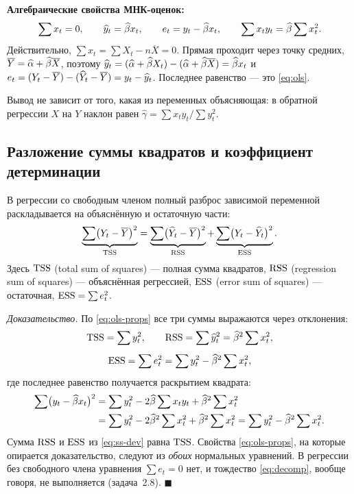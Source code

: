 \textbf{Алгебраические свойства МНК-оценок:}
\begin{equation}
  \sum x_t = 0,
  \qquad
  \widehat{y}_t = \widehat{\beta} x_t,
  \qquad
  e_t = y_t - \widehat{\beta} x_t,
  \qquad
  \sum x_ty_t = \widehat{\beta}\sum x_t^2 .
  \label{eq:ols-props}
\end{equation}
Действительно, $\sum x_t = \sum X_t - n\overline{X} = 0$. Прямая проходит через
точку средних, $\overline{Y} = \widehat{\alpha} + \widehat{\beta}\overline{X}$, поэтому
$\widehat{y}_t = (\widehat{\alpha} + \widehat{\beta} X_t) - (\widehat{\alpha} + \widehat{\beta}\overline{X}) = \widehat{\beta} x_t$ и
$e_t = (Y_t - \overline{Y}) - (\widehat{Y}_t - \overline{Y}) = y_t - \widehat{y}_t$.
Последнее равенство — это \eqref{eq:ols}.

\begin{remark}
Вывод не зависит от того, какая из переменных объясняющая: в обратной регрессии
$X$ на $Y$ наклон равен $\widehat{\gamma} = \sum x_ty_t \big/ \sum y_t^2$.
\end{remark}

\subsection{Разложение суммы квадратов и коэффициент детерминации}\label{sec:decomp}

В регрессии со свободным членом полный разброс зависимой переменной
раскладывается на объяснённую и остаточную части:
\begin{equation}
  \underbrace{\sum\bigl(Y_t - \overline{Y}\bigr)^2}_{\mathrm{TSS}}
  =
  \underbrace{\sum\bigl(\widehat{Y}_t - \overline{Y}\bigr)^2}_{\mathrm{RSS}}
  +
  \underbrace{\sum\bigl(Y_t - \widehat{Y}_t\bigr)^2}_{\mathrm{ESS}}.
  \label{eq:decomp}
\end{equation}
Здесь $\mathrm{TSS}$ (total sum of squares) — полная сумма квадратов, $\mathrm{RSS}$
(regression sum of squares) — объяснённая регрессией, $\mathrm{ESS}$ (error sum of
squares) — остаточная, $\mathrm{ESS} = \sum e_t^2$.

\emph{Доказательство.} По \eqref{eq:ols-props} все три суммы выражаются через
отклонения:
\begin{equation}
\begin{gathered}
  \mathrm{TSS} = \sum y_t^2,
  \qquad
  \mathrm{RSS} = \sum\widehat{y}_t^2 = \widehat{\beta}^2\sum x_t^2,
  \\[4pt]
  \mathrm{ESS} = \sum e_t^2 = \sum y_t^2 - \widehat{\beta}^2\sum x_t^2 ,
\end{gathered}
\label{eq:ss-dev}
\end{equation}
где последнее равенство получается раскрытием квадрата:
\[
\begin{aligned}
  \sum\bigl(y_t - \widehat{\beta} x_t\bigr)^2
  &= \sum y_t^2 - 2\widehat{\beta}\sum x_ty_t + \widehat{\beta}^2\sum x_t^2 \\
  &= \sum y_t^2 - 2\widehat{\beta}^2\sum x_t^2 + \widehat{\beta}^2\sum x_t^2
   = \sum y_t^2 - \widehat{\beta}^2\sum x_t^2 .
\end{aligned}
\]
Сумма $\mathrm{RSS}$ и $\mathrm{ESS}$ из \eqref{eq:ss-dev} равна $\mathrm{TSS}$. Свойства
\eqref{eq:ols-props}, на которые опирается доказательство, следуют из
\emph{обоих} нормальных уравнений. В регрессии без свободного члена уравнения
$\sum e_t = 0$ нет, и тождество \eqref{eq:decomp}, вообще говоря, не выполняется
(задача~2.8). $\blacksquare$

